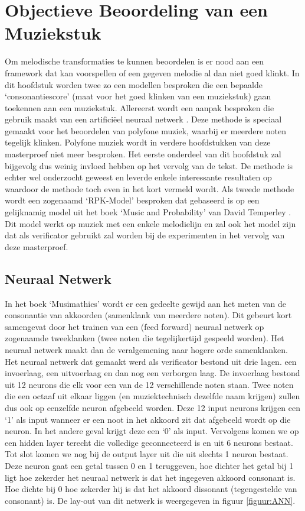 \chapter{Objectieve Beoordeling van een Muziekstuk}
\label{hoofdstuk:OBM}
Om melodische transformaties te kunnen beoordelen is er nood aan een framework dat kan voorspellen of een gegeven melodie al dan niet goed klinkt. In dit hoofdstuk worden twee zo een modellen besproken die een bepaalde `consonantiescore' (maat voor het goed klinken van een muziekstuk) gaan toekennen aan een muziekstuk. Allereerst wordt een aanpak besproken die gebruik maakt van een artifici\"eel neuraal netwerk \cite{book:ANN}. Deze methode is speciaal gemaakt voor het beoordelen van polyfone muziek, waarbij er meerdere noten tegelijk klinken. Polyfone muziek wordt in verdere hoofdstukken van deze masterproef niet meer besproken. Het eerste onderdeel van dit hoofdstuk zal bijgevolg dus weinig invloed hebben op het vervolg van de tekst. De methode is echter wel onderzocht geweest en leverde enkele interessante resultaten op waardoor de methode toch even in het kort vermeld wordt. Als tweede methode wordt een zogenaamd `RPK-Model' besproken dat gebaseerd is op een gelijknamig model uit het boek `Music and Probability' \cite{book:musicAndProbability} van David Temperley \cite{url:temperley}. Dit model werkt op muziek met een enkele melodielijn en zal ook het model zijn dat als verificator gebruikt zal worden bij de experimenten in het vervolg van deze masterproef.

\section{Neuraal Netwerk}
\label{OBM:NN}
In het boek `Musimathics' \cite{book:musimathics} wordt er een gedeelte gewijd aan het meten van de consonantie van akkoorden (samenklank van meerdere noten). Dit gebeurt kort samengevat door het trainen van een (feed forward) neuraal netwerk\cite{url:FFNN} op zogenaamde tweeklanken (twee noten die tegelijkertijd gespeeld worden). Het neuraal netwerk maakt dan de veralgemening naar hogere orde samenklanken. Het neuraal netwerk dat gemaakt werd als verificator bestond uit drie lagen. een invoerlaag, een uitvoerlaag en dan nog een verborgen laag. De invoerlaag bestond uit 12 neurons die elk voor een van de 12 verschillende noten staan. Twee noten die een octaaf uit elkaar liggen (en muziektechnisch dezelfde naam krijgen) zullen dus ook op eenzelfde neuron afgebeeld worden. Deze 12 input neurons krijgen een `1' als input wanneer er een noot in het akkoord zit dat afgebeeld wordt op die neuron. In het andere geval krijgt deze een `0' als input. Vervolgens komen we op een hidden layer terecht die volledige geconnecteerd is en uit 6 neurons bestaat. Tot slot komen we nog bij de output layer uit die uit slechts 1 neuron bestaat. Deze neuron gaat een getal tussen 0 en 1 teruggeven, hoe dichter het getal bij 1 ligt hoe zekerder het neuraal netwerk is dat het ingegeven akkoord consonant is. Hoe dichte bij 0 hoe zekerder hij is dat het akkoord dissonant (tegengestelde van consonant) is. De lay-out van dit netwerk is weergegeven in figuur \ref{figuur:ANN}.\\

